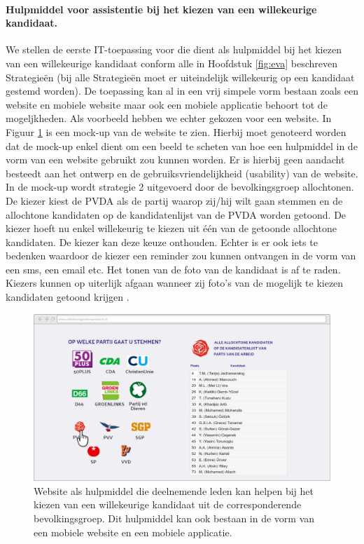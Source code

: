 \paragraph{Hulpmiddel voor assistentie bij het kiezen van een willekeurige kandidaat.}
We stellen de eerste IT-toepassing voor die dient als hulpmiddel bij het kiezen van een willekeurige kandidaat conform alle in Hoofdstuk \ref{fig:eva} beschreven Strategie\"{e}n (bij alle Strategie\"{e}n moet er uiteindelijk willekeurig op een kandidaat gestemd worden). De toepassing kan al in een vrij simpele vorm bestaan zoals een website en mobiele website maar ook een mobiele applicatie behoort tot de mogeljkheden. Als voorbeeld hebben we echter gekozen voor een website. In Figuur \ref{fig:verkW} is een mock-up van de website te zien. Hierbij moet genoteerd worden dat de mock-up enkel dient om een beeld te scheten van hoe een hulpmiddel in de vorm van een website gebruikt zou kunnen worden. Er is hierbij geen aandacht besteedt aan het ontwerp en de gebruiksvriendelijkheid (usability) van de website. \\
\indent In de mock-up wordt strategie 2 uitgevoerd door de bevolkingsgroep allochtonen. De kiezer kiest de PVDA als de partij waarop zij/hij wilt gaan stemmen en de allochtone kandidaten op de kandidatenlijst van de PVDA worden getoond. De kiezer hoeft nu enkel willekeurig te kiezen uit één van de getoonde allochtone kandidaten. De kiezer kan deze keuze onthouden. Echter is er ook iets te bedenken waardoor de kiezer een reminder zou kunnen ontvangen in de vorm van een sms, een email etc. Het tonen van de foto van de kandidaat is af te raden. Kiezers kunnen op uiterlijk afgaan wanneer zij foto's van de mogelijk te kiezen kandidaten getoond krijgen \citep{banducci2008ballot,lawson2010looking}. \\


\begin{figure}[H]


	\includegraphics[width=\linewidth]{website_verkiezingen.png}

			\caption{Website als hulpmiddel die deelnemende leden kan helpen bij het kiezen van een willekeurige kandidaat uit de corresponderende bevolkingsgroep. Dit hulpmiddel kan ook bestaan in de vorm van een mobiele website en een mobiele applicatie.}

\label{fig:verkW}
\end{figure}

